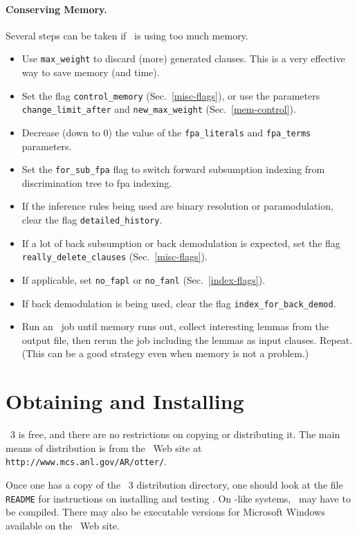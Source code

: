 \documentclass[11pt]{article}
\begin{document}
\paragraph{Conserving Memory.}
Several steps can be taken if \otter\ is using too much memory.
\begin{itemize}
\item
Use \verb:max_weight: to discard (more) generated clauses.
This is a very effective way to save memory (and time).
\item
Set the flag \verb:control_memory: (Sec.~\ref{misc-flags}), or use the parameters \\
\verb:change_limit_after: and \verb:new_max_weight: (Sec.~\ref{mem-control}).
\item
Decrease (down to 0) the value of the \verb:fpa_literals: and
\verb:fpa_terms: parameters.
\item
Set the \verb:for_sub_fpa: flag to switch forward subsumption indexing from
discrimination tree to {\sc fpa} indexing.
\item
If the inference rules being used are binary resolution or
paramodulation, clear the flag \verb:detailed_history:.
\item
If a lot of back subsumption or back demodulation is expected,
set the flag \verb:really_delete_clauses: (Sec.~\ref{misc-flags}).
\item
If applicable, set \verb:no_fapl: or \verb:no_fanl:
(Sec.~\ref{index-flags}).
\item
If back demodulation is being used, clear the flag \verb:index_for_back_demod:.
\item
Run an \otter\ job until memory runs out, collect interesting
lemmas from the output file, then rerun the job including the
lemmas as input clauses.  Repeat.  (This can be a good strategy
even when memory is not a problem.)
\end{itemize}

\section{Obtaining and Installing \otter}

\otter\ 3 is free, and there are no restrictions on copying
or distributing it.  The main means of distribution is from
the \otter\ Web site at \verb|http://www.mcs.anl.gov/AR/otter/|.

Once one has a copy of the \otter\ 3 distribution directory,
one should look at the file \verb:README: for instructions on installing
and testing \otter.  On \unix-like systems, \otter\ may
have to be compiled.  There may also be executable versions for
Microsoft Windows available on the \otter\ Web site.
\end{document}
